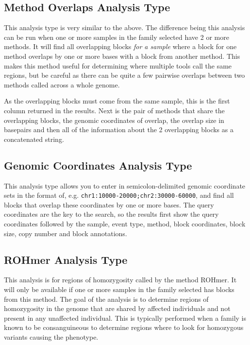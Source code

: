 \documentclass[11pt, a4paper]{article}
\begin{document}
\subsection{Method Overlaps Analysis Type}

This analysis type is very similar to the  above. The difference being this analysis can be run when one or more samples in the family selected have 2 or more methods. It will find all overlapping blocks \textit{for a sample} where a block for one method overlaps by one or more bases with a block from another method. This makes this method useful for determining where multiple tools call the same regions, but be careful as there can be quite a few pairwise overlaps between two methods called across a whole genome.

As the overlapping blocks must come from the same sample, this is the first column returned in the results. Next is the pair of methods that share the overlapping blocks, the genomic coordinates of overlap, the overlap size in basepairs and then all of the information about the 2 overlapping blocks as a concatenated string.

\subsection{Genomic Coordinates Analysis Type}

This analysis type allows you to enter in semicolon-delimited genomic coordinate sets in the format of, e.g. \texttt{chr1:10000-20000;chr2:30000-60000}, and find all blocks that overlap these coordinates by one or more bases. The query coordinates are the key to the search, so the results first show the query coordinates followed by the sample, event type, method, block coordinates, block size, copy number and block annotations.

\subsection{ROHmer Analysis Type}

This analysis is for regions of homozygosity called by the method ROHmer. It will only be available if one or more samples in the family selected has blocks from this method. The goal of the analysis is to determine regions of homozygosity in the genome that are shared by affected individuals and not present in any unaffected individual. This is typically performed when a family is known to be consanguineous to determine regions where to look for homozygous variants causing the phenotype.
\end{document}

